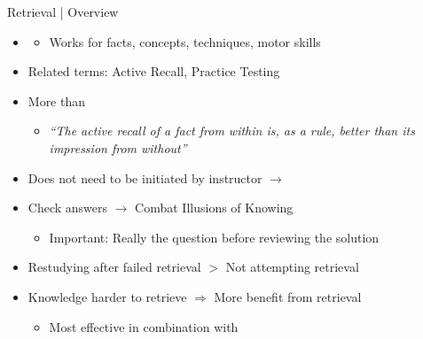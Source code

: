 \documentclass{ercisbeamer}
\begin{document}
\begin{frame}{Retrieval | Overview}
    \begin{itemize}
        \item {}
        \begin{itemize}
            \item Works for facts, concepts, techniques, motor skills
        \end{itemize}
        \item Related terms: Active Recall, Practice Testing
        \item More than 
        \begin{itemize}
            \item \emph{``The active recall of a fact from within is, as a rule, better than its impression from without'' }
        \end{itemize}
        \item Does not need to be initiated by instructor $\rightarrow$ 
        \item Check answers $\rightarrow$ Combat Illusions of Knowing 
        \begin{itemize}
            \item Important: Really  the question before reviewing the solution
        \end{itemize}
        \item Restudying after failed retrieval $>$ Not attempting retrieval
        \item Knowledge harder to retrieve $\Rightarrow$ More benefit from retrieval
        \begin{itemize}
            \item Most effective in combination with 
        \end{itemize}
    \end{itemize}
\end{frame}
\end{document}
